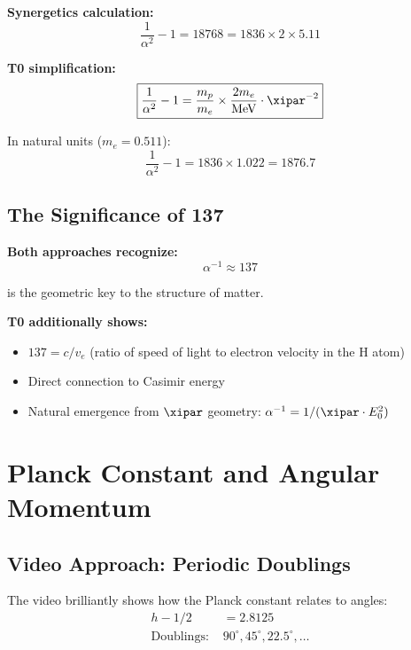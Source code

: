 	\begin{vergleich}
		\textbf{Synergetics calculation:}
		\begin{equation}
			\frac{1}{\alpha^2} - 1 = 18768 = 1836 \times 2 \times 5.11
		\end{equation}
		
		\textbf{T0 simplification:}
		\begin{equation}
			\boxed{\frac{1}{\alpha^2} - 1 = \frac{m_p}{m_e} \times \frac{2m_e}{\text{MeV}} \cdot \xipar^{-2}}
		\end{equation}
		
		In natural units ($m_e = 0.511$):
		\begin{equation}
			\boxed{\frac{1}{\alpha^2} - 1 = 1836 \times 1.022 = 1876.7}
		\end{equation}
	\end{vergleich}
	
	\subsection{The Significance of 137}
	
	\begin{gemeinsam}
		\textbf{Both approaches recognize:}
		\begin{equation}
			\alpha^{-1} \approx 137
		\end{equation}
		
		is the geometric key to the structure of matter.
		
		\textbf{T0 additionally shows:}
		\begin{itemize}
			\item $137 = c/v_e$ (ratio of speed of light to electron velocity in the H atom)
			\item Direct connection to Casimir energy
			\item Natural emergence from $\xipar$ geometry: $\alpha^{-1} = 1/(\xipar \cdot E_0^2)$
		\end{itemize}
	\end{gemeinsam}
	\section{Planck Constant and Angular Momentum}
	
	\subsection{Video Approach: Periodic Doublings}
	
	The video brilliantly shows how the Planck constant relates to angles:
	\begin{align}
		h - 1/2 &= 2.8125 \\
		\text{Doublings: } &90^\circ, 45^\circ, 22.5^\circ, \ldots
	\end{align}
	
